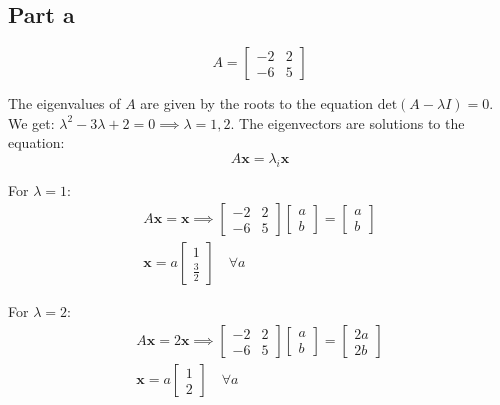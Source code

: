 \documentclass{article}
\begin{document}
\subsection*{Part a}
\begin{flushleft}
\begin{equation*}
A = \begin{bmatrix} 
-2 & 2 \\
-6 & 5
\end{bmatrix}
\end{equation*}

The eigenvalues of \(A\) are given by the roots to the equation \(\text{det}(A - \lambda I) = 0\). We get: \(\lambda^2 - 3\lambda + 2 = 0 \implies \lambda = 1, 2\). The eigenvectors are solutions to the equation:
\begin{equation*}
A \mathbf{x} = \lambda_{i} \mathbf{x} 
\end{equation*}

For \(\lambda = 1\):
\begin{gather*}
A \mathbf{x} = \mathbf{x} \implies \begin{bmatrix} -2 & 2 \\ -6 & 5 \end{bmatrix} \begin{bmatrix} a \\ b \end{bmatrix} = \begin{bmatrix} a \\ b \end{bmatrix} \\
\mathbf{x} = a \begin{bmatrix} 1 \\ \frac{3}{2} \end{bmatrix} \quad \forall a
\end{gather*}

For \(\lambda = 2\):
\begin{gather*}
A \mathbf{x} = 2\mathbf{x} \implies \begin{bmatrix} -2 & 2 \\ -6 & 5 \end{bmatrix} \begin{bmatrix} a \\ b \end{bmatrix} = \begin{bmatrix} 2a \\ 2b \end{bmatrix} \\
\mathbf{x} = a \begin{bmatrix} 1 \\ 2 \end{bmatrix} \quad \forall a
\end{gather*}
\end{flushleft}
\end{document}
